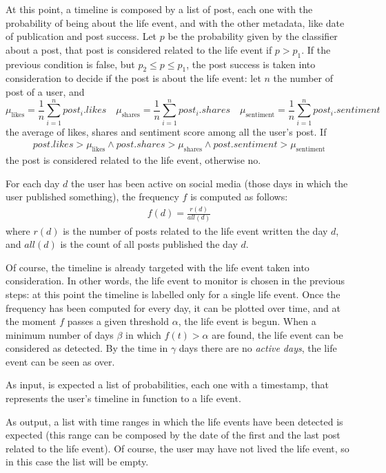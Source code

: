At this point, a timeline is composed by a list of post, each one with the probability of being about the life event, and with the other metadata, like date of publication and post success. Let $p$ be the probability given by the classifier about a post, that post is considered related to the life event if $ p > p_1$. If the previous condition is false, but $p_2 \leq p \leq p_1 $, the post success is taken into consideration to decide if the post is about the life event: let $n$ the number of post of a user, and
\[
\mu_\text{likes} = \frac{1}{n} \sum_{i=1}^n post_i.likes \quad \mu_\text{shares} = \frac{1}{n} \sum_{i=1}^n post_i.shares \quad \mu_\text{sentiment} = \frac{1}{n} \sum_{i=1}^n post_i.sentiment
\]
the average of likes, shares and sentiment score among all the user's post. If 
\begin{gather}
\label{avgs}
post.likes > \mu_\text{likes} \land post.shares > \mu_\text{shares} \land post.sentiment > \mu_\text{sentiment}
\end{gather}
the post is considered related to the life event, otherwise no.

For each day $d$ the user has been active on social media (those days in which the user published something), the frequency $f$ is computed as follows:
\begin{gather}
f(d) = \frac{r(d)}{all(d)}
\label{freq}
\end{gather}
where $r(d)$ is the number of posts related to the life event written the day $d$, and $all(d)$ is the count of all posts published the day $d$.

Of course, the timeline is already targeted with the life event taken into consideration. In other words, the life event to monitor is chosen in the previous steps: at this point the timeline is labelled only for a single life event. Once the frequency has been computed for every day, it can be plotted over time, and at the moment $f$ passes a given threshold $\alpha$, the life event is begun. When a minimum number of days $\beta$ in which $f(t) > \alpha$ are found, the life event can be considered as detected. By the time in $\gamma$ days there are no \emph{active days}, the life event can be seen as over.

As input, is expected a list of probabilities, each one with a timestamp, that represents the user's timeline in function to a life event.

As output, a list with time ranges in which the life events have been detected is expected (this range can be composed by the date of the first and the last post related to the life event). Of course, the user may have not lived the life event, so in this case the list will be empty.


